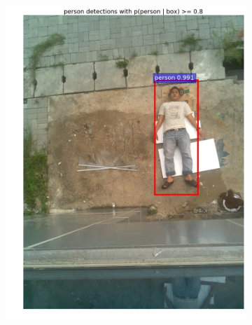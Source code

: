 \begin{figure}[ht]
  \centering
  \begin{subfigure}[b]{0.27\textwidth}
    \includegraphics[width=\textwidth]{1}
    \caption{}
  \end{subfigure}             
  \begin{subfigure}[b]{0.27\textwidth}

\end{subfigure}
\end{figure}
